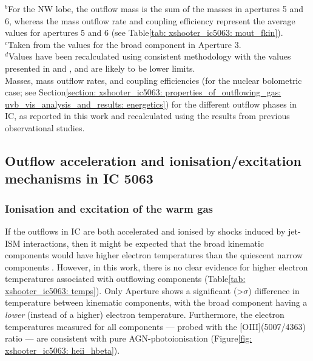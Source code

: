 \begin{table}
	$^b$For the NW lobe, the outflow mass is the sum of the masses in apertures 5 and 6, whereas the mass outflow rate and coupling efficiency represent the average values for apertures 5 and 6 (see Table\;\ref{tab: xshooter_ic5063: mout_fkin}). \\
	$^c$Taken from the values for the broad component in Aperture 3. \\
	$^d$Values have been recalculated using consistent methodology with the values presented in \citet{Morganti2005} and \citet{Oosterloo2017}, and are likely to be lower limits. \\
	\caption[Masses, mass outflow rates, and coupling efficiencies for the various outflow phases in IC, calculated with consistent methodology.]{Masses, mass outflow rates, and coupling efficiencies (for the nuclear bolometric case; see Section\;\ref{section: xshooter_ic5063: properties_of_outflowing_gas: uvb_vis_analysis_and_results: energetics}) for the different outflow phases in IC, as reported in this work and recalculated using the results from previous observational studies.}
	\label{tab: xshooter_ic5063: all_phases}
\end{table}


\subsection{Outflow acceleration and ionisation/excitation mechanisms in IC 5063}
\label{section: xshooter_ic5063: discussion: mechanisms}

\subsubsection{Ionisation and excitation of the warm gas}
\label{section: xshooter_ic5063: discussion: mechanisms: warm_gas}

If the outflows in IC are both accelerated and ionised by shocks induced by jet-ISM interactions, then it might be expected that the broad kinematic components would have higher electron temperatures than the quiescent narrow components \citep{Fosbury1978, VillarMartin1999}. However, in this work, there is no clear evidence for higher electron temperatures associated with outflowing components (Table\;\ref{tab: xshooter_ic5063: temps}). Only Aperture shows a significant (\mbox{\textgreater{}$\sigma$}) difference in temperature between kinematic components, with the broad component having a \textit{lower} (instead of a higher) electron temperature. Furthermore, the electron temperatures measured for all components --- probed with the [OIII](5007/4363) ratio --- are consistent with pure AGN-photoionisation (Figure\;\ref{fig: xshooter_ic5063: heii_hbeta}).

